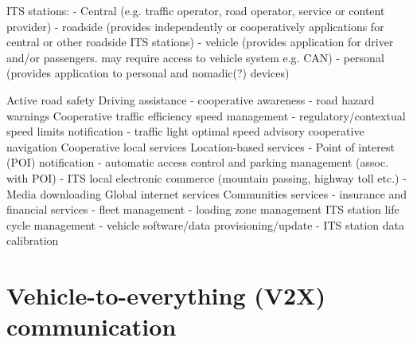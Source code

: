 



ITS stations:
    - Central (e.g. traffic operator, road operator, service or content provider)
    - roadside (provides independently or cooperatively applications for central or other roadside ITS stations)
    - vehicle (provides application for driver and/or passengers. may require access to vehicle system e.g. CAN)
    - personal (provides application to personal and nomadic(?) devices)




 
Active road safety
    Driving assistance
        - cooperative awareness
        - road hazard warnings
Cooperative traffic efficiency
    speed management
        - regulatory/contextual speed limits notification
        - traffic light optimal speed advisory
    cooperative navigation
Cooperative local services
    Location-based services
        - Point of interest (POI) notification
        - automatic access control and parking management
        (assoc. with POI)
        - ITS local electronic commerce (mountain passing, highway toll etc.)
        - Media downloading
Global internet services
    Communities services
        - insurance and financial services
        - fleet management
        - loading zone management
    ITS station life cycle management
        - vehicle software/data provisioning/update
        - ITS station data calibration






\section{Vehicle-to-everything (V2X) communication}

